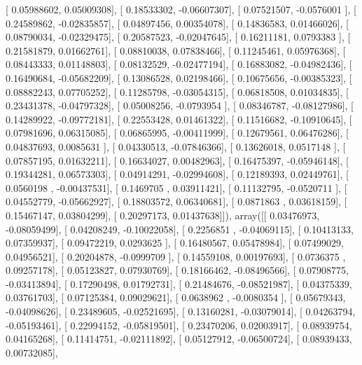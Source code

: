 \documentclass{article}
\begin{document}
       [ 0.05988602,  0.05009308],
       [ 0.18533302, -0.06607307],
       [ 0.07521507, -0.0576001 ],
       [ 0.24589862, -0.02835857],
       [ 0.04897456,  0.00354078],
       [ 0.14836583,  0.01466026],
       [ 0.08790034, -0.02329475],
       [ 0.20587523, -0.02047645],
       [ 0.16211181,  0.0793383 ],
       [ 0.21581879,  0.01662761],
       [ 0.08810038,  0.07838466],
       [ 0.11245461,  0.05976368],
       [ 0.08443333,  0.01148803],
       [ 0.08132529, -0.02477194],
       [ 0.16883082, -0.04982436],
       [ 0.16490684, -0.05682209],
       [ 0.13086528,  0.02198466],
       [ 0.10675656, -0.00385323],
       [ 0.08882243,  0.07705252],
       [ 0.11285798, -0.03054315],
       [ 0.06818508,  0.01034835],
       [ 0.23431378, -0.04797328],
       [ 0.05008256, -0.0793954 ],
       [ 0.08346787, -0.08127986],
       [ 0.14289922, -0.09772181],
       [ 0.22553428,  0.01461322],
       [ 0.11516682, -0.10910645],
       [ 0.07981696,  0.06315085],
       [ 0.06865995, -0.00411999],
       [ 0.12679561,  0.06476286],
       [ 0.04837693,  0.0085631 ],
       [ 0.04330513, -0.07846366],
       [ 0.13626018,  0.0517148 ],
       [ 0.07857195,  0.01632211],
       [ 0.16634027,  0.00482963],
       [ 0.16475397, -0.05946148],
       [ 0.19344281,  0.06573303],
       [ 0.04914291, -0.02994608],
       [ 0.12189393,  0.02449761],
       [ 0.0560198 , -0.00437531],
       [ 0.1469705 ,  0.03911421],
       [ 0.11132795, -0.0520711 ],
       [ 0.04552779, -0.05662927],
       [ 0.18803572,  0.06340681],
       [ 0.0871863 ,  0.03618159],
       [ 0.15467147,  0.03804299],
       [ 0.20297173,  0.01437638]]), array([[ 0.03476973, -0.08059499],
       [ 0.04208249, -0.10022058],
       [ 0.2256851 , -0.04069115],
       [ 0.10413133,  0.07359937],
       [ 0.09472219,  0.0293625 ],
       [ 0.16480567,  0.05478984],
       [ 0.07499029,  0.04956521],
       [ 0.20204878, -0.0999709 ],
       [ 0.14559108,  0.00197693],
       [ 0.0736375 ,  0.09257178],
       [ 0.05123827,  0.07930769],
       [ 0.18166462, -0.08496566],
       [ 0.07908775, -0.03413894],
       [ 0.17290498,  0.01792731],
       [ 0.21484676, -0.08521987],
       [ 0.04375339,  0.03761703],
       [ 0.07125384,  0.09029621],
       [ 0.0638962 , -0.0080354 ],
       [ 0.05679343, -0.04098626],
       [ 0.23489605, -0.02521695],
       [ 0.13160281, -0.03079014],
       [ 0.04263794, -0.05193461],
       [ 0.22994152, -0.05819501],
       [ 0.23470206,  0.02003917],
       [ 0.08939754,  0.04165268],
       [ 0.11414751, -0.02111892],
       [ 0.05127912, -0.06500724],
       [ 0.08939433,  0.00732085],
\end{document}
